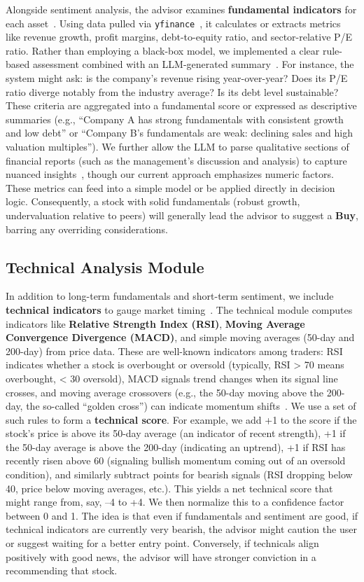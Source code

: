 \documentclass[conference]{IEEEtran}
\begin{document}
Alongside sentiment analysis, the advisor examines \textbf{fundamental indicators} for each asset~\cite{yfinance2023}. Using data pulled via \texttt{yfinance}~\cite{yfinance2023}, it calculates or extracts metrics like revenue growth, profit margins, debt-to-equity ratio, and sector-relative P/E ratio. Rather than employing a black-box model, we implemented a clear rule-based assessment combined with an LLM-generated summary~\cite{finbert2020}. For instance, the system might ask: is the company’s revenue rising year-over-year? Does its P/E ratio diverge notably from the industry average? Is its debt level sustainable? These criteria are aggregated into a fundamental score or expressed as descriptive summaries (e.g., ``Company A has strong fundamentals with consistent growth and low debt'' or ``Company B’s fundamentals are weak: declining sales and high valuation multiples''). We further allow the LLM to parse qualitative sections of financial reports (such as the management’s discussion and analysis) to capture nuanced insights~\cite{bloomberggpt2023}, though our current approach emphasizes numeric factors. These metrics can feed into a simple model or be applied directly in decision logic. Consequently, a stock with solid fundamentals (robust growth, undervaluation relative to peers) will generally lead the advisor to suggest a \textbf{Buy}, barring any overriding considerations.


\subsection{Technical Analysis Module}

In addition to long-term fundamentals and short-term sentiment, we include \textbf{technical indicators} to gauge market timing~\cite{hossain2019}. The technical module computes indicators like \textbf{Relative Strength Index (RSI)}, \textbf{Moving Average Convergence Divergence (MACD)}, and simple moving averages (50-day and 200-day) from price data. These are well-known indicators among traders: RSI indicates whether a stock is overbought or oversold (typically, RSI > 70 means overbought, < 30 oversold), MACD signals trend changes when its signal line crosses, and moving average crossovers (e.g., the 50-day moving above the 200-day, the so-called ``golden cross'') can indicate momentum shifts~\cite{hossain2019}. We use a set of such rules to form a \textbf{technical score}. For example, we add +1 to the score if the stock’s price is above its 50-day average (an indicator of recent strength), +1 if the 50-day average is above the 200-day (indicating an uptrend), +1 if RSI has recently risen above 60 (signaling bullish momentum coming out of an oversold condition), and similarly subtract points for bearish signals (RSI dropping below 40, price below moving averages, etc.). This yields a net technical score that might range from, say, –4 to +4. We then normalize this to a confidence factor between 0 and 1. The idea is that even if fundamentals and sentiment are good, if technical indicators are currently very bearish, the advisor might caution the user or suggest waiting for a better entry point. Conversely, if technicals align positively with good news, the advisor will have stronger conviction in a recommending that stock. 
\end{document}
